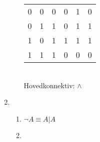 \documentclass[a4paper, 12pt]{article}  %
\begin{document}
\begin{enumerate}
\begin{enumerate}
\begin{tabular}[t]{c c c c c|c}
            \hline
            0 & 0 & 0 & 0 & 1 & 0 \\
            0 & 1 & 1 & 0 & 1 & 1 \\
            1 & 0 & 1 & 1 & 1 & 1 \\
            1 & 1 & 1 & 0 & 0 & 0 \\
        \end{tabular}
        \\Hovedkonnektiv: \(\land\)
    \end{enumerate}
    \item [\boxed{5}]
    \begin{enumerate}
        \item \(\neg A \equiv A | A\) 
        \item 
    \end{enumerate}
\end{enumerate}

\end{document}
